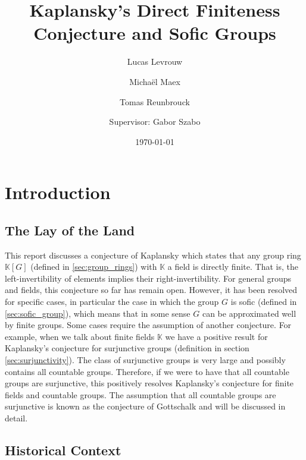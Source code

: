 \documentclass[titlepage, a4paper]{article}
\author{Lucas Levrouw \and Michaël Maex \and Tomas Reunbrouck \and Supervisor: Gabor Szabo}
\title{Kaplansky's Direct Finiteness Conjecture and Sofic Groups}
\date{\today}
\theoremstyle{definition}
\theoremstyle{remark}
\begin{document}
    \maketitle
\begingroup
  \pagestyle{empty}
  \null
  \newpage
\endgroup
{}
\tableofcontents
\pagebreak



\section{Introduction}\label{sec:intro}

\subsection*{The Lay of the Land}

This report discusses a conjecture of Kaplansky which states that any group ring $\mathbb{K}[G]$ (defined in \cref{sec:group_rings}) with $\mathbb{K}$ a field is directly finite. That is, the left-invertibility of elements implies their right-invertibility. For general groups and fields, this conjecture so far has remain open. However, it has been resolved for specific cases, in particular the case in which the group $G$ is sofic (defined in \cref{sec:sofic_group}), which means that in some sense $G$ can be approximated well by finite groups. Some cases require the assumption of another conjecture. For example, when we talk about finite fields $\mathbb{K}$ we have a positive result for Kaplansky’s conjecture for surjunctive groups (definition in section \ref{sec:surjunctivity}). The class of surjunctive groups is very large and possibly contains all countable groups. Therefore, if we were to have that all countable groups are surjunctive, this positively resolves Kaplansky's conjecture for finite fields and countable groups.
The assumption that all countable groups are surjunctive is known as the conjecture of Gottschalk and will be discussed in detail.

\subsection*{Historical Context}
\end{document}
